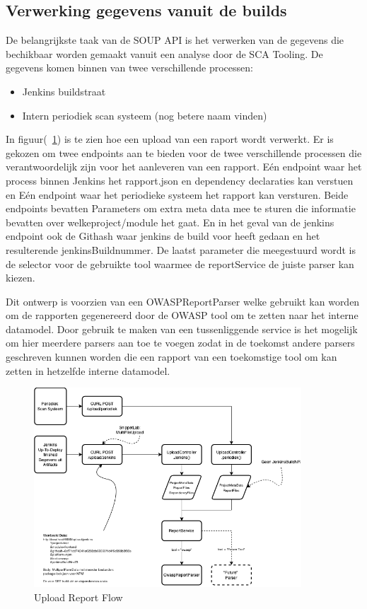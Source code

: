 \subsection{Verwerking gegevens vanuit de builds}\label{subsec:verwerking-gegevens-vanuit-de-sca}
De belangrijkste taak van de SOUP API is het verwerken van de gegevens die bechikbaar worden gemaakt vanuit een analyse door de SCA Tooling. De gegevens komen binnen van twee verschillende processen:
\begin{itemize}
    \item Jenkins buildstraat
    \item Intern periodiek scan systeem (nog betere naam vinden)
\end{itemize}
In figuur(~\ref{fig:UploadReportFlow}) is te zien hoe een upload van een raport wordt verwerkt. Er is gekozen om twee endpoints aan te bieden voor de twee verschillende processen die verantwoordelijk zijn voor het aanleveren van een rapport. Eén endpoint waar het process binnen Jenkins het rapport.json en dependency declaraties kan verstuen en Eén endpoint waar het periodieke systeem het rapport kan versturen.
Beide endpoints bevatten Parameters om extra meta data mee te sturen die informatie bevatten over welkeproject/module het gaat. En in het geval van de jenkins endpoint ook de Githash waar jenkins de build voor heeft gedaan en het resulterende jenkinsBuildnummer. De laatst parameter die meegestuurd wordt is de selector voor de gebruikte tool waarmee de reportService de juiste parser kan kiezen.

Dit ontwerp is voorzien van een OWASPReportParser welke gebruikt kan worden om de rapporten gegenereerd door de OWASP tool om te zetten naar het interne datamodel. Door gebruik te maken van een tussenliggende service is het mogelijk om hier meerdere parsers aan toe te voegen zodat in de toekomst andere parsers geschreven kunnen worden die een rapport van een toekomstige tool om kan zetten in hetzelfde interne datamodel.


\begin{figure}[bth]
    \myfloatalign
    \includegraphics[width=10cm]{gfx/SOUPAPI-UploadAnalysis}
    \caption{Upload Report Flow}
    \label{fig:UploadReportFlow}
\end{figure}

